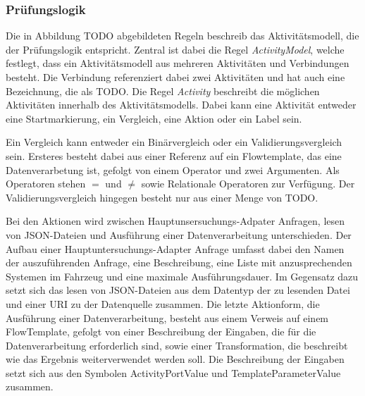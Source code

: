 \documentclass{article}
\begin{document}
    \subsubsection{Prüfungslogik}
    Die in Abbildung TODO abgebildeten Regeln beschreib das Aktivitätsmodell, die der Prüfungslogik entspricht. \cite{99}
    Zentral ist dabei die Regel \textit{ActivityModel}, welche festlegt, dass ein Aktivitätsmodell aus mehreren Aktivitäten und Verbindungen besteht.
    Die Verbindung referenziert dabei zwei Aktivitäten und hat auch eine Bezeichnung, die als TODO.
    Die Regel \textit{Activity} beschreibt die möglichen Aktivitäten innerhalb des Aktivitätsmodells. Dabei kann eine Aktivität entweder eine Startmarkierung, ein Vergleich, eine Aktion oder ein Label sein.
    
    Ein Vergleich kann entweder ein Binärvergleich oder ein Validierungsvergleich sein.
    Ersteres besteht dabei aus einer Referenz auf ein Flowtemplate, das eine Datenverarbetung ist, gefolgt von einem Operator und zwei Argumenten. Als Operatoren stehen $=$ und $\neq$ sowie Relationale Operatoren zur Verfügung.
    Der Validierungsvergleich hingegen besteht nur aus einer Menge von TODO.

    Bei den Aktionen wird zwischen Hauptunsersuchungs-Adpater Anfragen, lesen von JSON-Dateien und Ausführung einer Datenverarbeitung unterschieden.
    Der Aufbau einer Hauptuntersuchungs-Adapter Anfrage umfasst dabei den Namen der auszuführenden Anfrage, eine Beschreibung, eine Liste mit anzusprechenden Systemen im Fahrzeug und eine maximale Ausführungsdauer.
    Im Gegensatz dazu setzt sich das lesen von JSON-Dateien aus dem Datentyp der zu lesenden Datei und einer URI zu der Datenquelle zusammen.
    Die letzte Aktionform, die Ausführung einer Datenverarbeitung, besteht aus einem Verweis auf einem FlowTemplate, gefolgt von einer Beschreibung der Eingaben, die für die Datenverarbeitung erforderlich sind, sowie einer Transformation, die beschreibt wie das Ergebnis weiterverwendet werden soll.    
    Die Beschreibung der Eingaben setzt sich aus den Symbolen ActivityPortValue und TemplateParameterValue zusammen.
\end{document}
